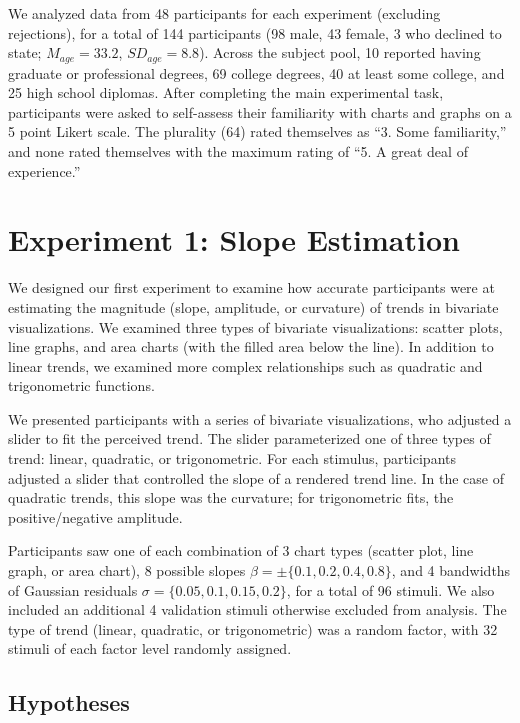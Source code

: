 \documentclass{sigchi}
\begin{document}
We analyzed data from 48 participants for each experiment (excluding rejections), for a total of 144 participants (98 male, 43 female, 3 who declined to state; $M_{age}= 33.2$, $SD_{age}=8.8$). Across the subject pool, 10 reported having graduate or professional degrees, 69 college degrees, 40 at least some college, and 25 high school diplomas. After completing the main experimental task, participants were asked to self-assess their familiarity with charts and graphs on a 5 point Likert scale. The plurality (64) rated themselves as ``3. Some familiarity,'' and none rated themselves with the maximum rating of ``5. A great deal of experience.''

\section{Experiment 1: Slope Estimation}

We designed our first experiment to examine how accurate participants were at estimating the magnitude (slope, amplitude, or curvature) of trends in bivariate visualizations. We examined three types of bivariate visualizations: scatter plots, line graphs, and area charts (with the filled area below the line). In addition to linear trends, we examined more complex relationships such as quadratic and trigonometric functions.

We presented participants with a series of bivariate visualizations, who adjusted a slider to fit the perceived trend. The slider parameterized one of three types of trend: linear, quadratic, or trigonometric. For each stimulus, participants adjusted a slider that controlled the slope of a rendered trend line. In the case of quadratic trends, this slope was the curvature; for trigonometric fits, the positive/negative amplitude.

Participants saw one of each combination of 3 chart types (scatter plot, line graph, or area chart), 8 possible slopes $\beta = \pm \{0.1,0.2,0.4,0.8\}$, and 4 bandwidths of Gaussian residuals $\sigma = \{0.05,0.1,0.15,0.2\}$, for a total of 96 stimuli. We also included an additional 4 validation stimuli otherwise excluded from analysis. The type of trend (linear, quadratic, or trigonometric) was a random factor, with 32 stimuli of each factor level randomly assigned.

\subsection{Hypotheses}
\end{document}
